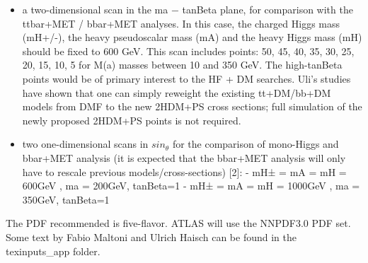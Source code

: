\begin{itemize}

\item a two-dimensional scan in the ma − tanBeta plane, for
comparison with the ttbar+MET / bbar+MET analyses. In this case, the
charged Higgs mass (mH+/-), the heavy pseudoscalar mass (mA) and the
heavy Higgs mass (mH) should be fixed to 600 GeV. This scan includes points: 
50, 45, 40, 35, 30, 25, 20, 15, 10, 5
for M(a) masses between 10 and 350 GeV. The high-tanBeta points would be
of primary interest to the HF + DM searches. Uli's studies have shown
that one can simply reweight the existing tt+DM/bb+DM models from DMF to
the new 2HDM+PS cross sections; full simulation of the newly proposed
2HDM+PS points is not required.

\item two one-dimensional scans in $sin_{\theta}$ for the comparison of
mono-Higgs and bbar+MET analysis (it is expected that the bbar+MET
analysis will only have to rescale previous models/cross-sections)
{[}2{]}: - mH± = mA = mH = 600GeV , ma = 200GeV, tanBeta=1 - mH± = mA =
mH = 1000GeV , ma = 350GeV, tanBeta=1

\end{itemize}

The PDF recommended is five-flavor. ATLAS will use the NNPDF3.0
PDF set. Some text by Fabio Maltoni and Ulrich Haisch can be found in the texinputs\_app folder.  

